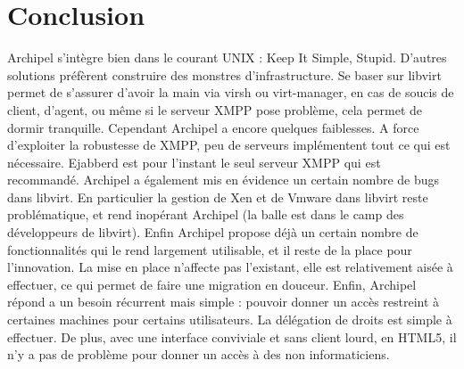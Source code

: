     \section{Conclusion}
Archipel s'intègre bien dans le courant UNIX : Keep It Simple, Stupid. D'autres solutions préfèrent
construire des monstres d'infrastructure. Se baser sur libvirt permet de s'assurer d'avoir la main via virsh
ou virt-manager, en cas de soucis de client, d'agent, ou même si le serveur XMPP pose problème, cela
permet de dormir tranquille.\newline
Cependant Archipel a encore quelques faiblesses. A force d'exploiter la robustesse de XMPP, peu de
serveurs implémentent tout ce qui est nécessaire. Ejabberd est pour l'instant le seul serveur XMPP qui est
recommandé. Archipel a également mis en évidence un certain nombre de bugs dans libvirt. En particulier
la gestion de Xen et de Vmware dans libvirt reste problématique, et rend inopérant Archipel (la balle est
dans le camp des développeurs de libvirt). Enfin Archipel propose déjà un certain nombre de
fonctionnalités qui le rend largement utilisable, et il reste de la place pour l'innovation.\newline
La mise en place n'affecte pas l'existant, elle est relativement aisée à effectuer, ce qui permet de faire
une migration en douceur.\newline
Enfin, Archipel répond a un besoin récurrent mais simple : pouvoir donner un accès restreint à certaines
machines pour certains utilisateurs. La délégation de droits est simple à effectuer. De plus, avec une
interface conviviale et sans client lourd, en HTML5, il n'y a pas de problème pour donner un accès à des
non informaticiens.

%
%
     
